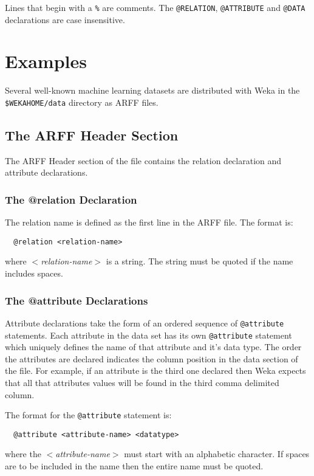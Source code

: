 Lines that begin with a \texttt{\%} are comments. The \texttt{@RELATION}, \texttt{@ATTRIBUTE} and \texttt{@DATA} declarations are case insensitive.


\section{Examples}
Several well-known machine learning datasets are distributed with Weka in the \texttt{\$WEKAHOME/data} directory as ARFF files.


\subsection{The ARFF Header Section}
The ARFF Header section of the file contains the relation declaration and attribute declarations. 


\subsubsection*{The @relation Declaration}
The relation name is defined as the first line in the ARFF file. The format is:

\begin{verbatim}
  @relation <relation-name>
\end{verbatim}

where \textit{$<$relation-name$>$} is a string. The string must be quoted if the name includes spaces.


\subsubsection*{The @attribute Declarations}
Attribute declarations take the form of an ordered sequence of \texttt{@attribute} statements. Each attribute in the data set has its own \texttt{@attribute} statement which uniquely defines the name of that attribute and it's data type. The order the attributes are declared indicates the column position in the data section of the file. For example, if an attribute is the third one declared then Weka expects that all that attributes values will be found in the third comma delimited column.

The format for the \texttt{@attribute} statement is:

\begin{verbatim}
  @attribute <attribute-name> <datatype>
\end{verbatim}

where the \textit{$<$attribute-name$>$} must start with an alphabetic character. If spaces are to be included in the name then the entire name must be quoted.

